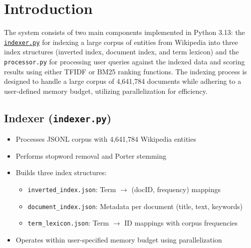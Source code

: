 

\section{Introduction}

The system consists of two main components implemented in Python 3.13: the \hyperref[subsec:indexer]{\texttt{indexer.py}} for indexing a large corpus of entities from Wikipedia into three index structures (inverted index, document index, and term lexicon) and the \texttt{processor.py} for processing user queries against the indexed data and scoring results using either TFIDF or BM25 ranking functions. The indexing process is designed to handle a large corpus of 4,641,784 documents while adhering to a user-defined memory budget, utilizing parallelization for efficiency.

\subsection{Indexer (\texttt{indexer.py})} \label{subsec:indexer}

\begin{itemize}
  \item Processes JSONL corpus with 4,641,784 Wikipedia entities
  \item Performs stopword removal and Porter stemming
  \item Builds three index structures:
        \begin{itemize}
          \item \texttt{inverted\_index.json}: Term $\rightarrow$ (docID, frequency) mappings
          \item \texttt{document\_index.json}: Metadata per document (title, text, keywords)
          \item \texttt{term\_lexicon.json}: Term $\rightarrow$ ID mappings with corpus frequencies
        \end{itemize}
  \item Operates within user-specified memory budget using parallelization
\end{itemize}

